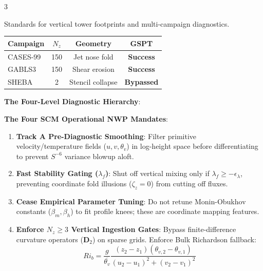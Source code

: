 \documentclass[9pt,landscape,letterpaper]{article}
\begin{document}
\begin{multicols}{3}
\begin{tcolorbox}[cheatsheetbox, title=6. Campaign Taxonomy \& NWP Mandates]
Standards for vertical tower footprints and multi-campaign diagnostics.
\begin{center}
\footnotesize
\setlength{\tabcolsep}{3pt}
\begin{tabular}{lccc}
    \toprule
    \textbf{Campaign} & $N_z$ & \textbf{Geometry} & \textbf{GSPT} \\
    \midrule
    CASES-99 & 150 & Jet nose fold & \textbf{Success} \\
    GABLS3 & 150 & Shear erosion & \textbf{Success} \\
    SHEBA & 2 & Stencil collapse & \textbf{Bypassed} \\
    \bottomrule
\end{tabular}
\end{center}
\vskip 0.5mm
\textbf{The Four-Level Diagnostic Hierarchy}:
\begin{center}
\footnotesize
{}
\end{center}
\textbf{The Four SCM Operational NWP Mandates}:
\begin{enumerate}
    \item \textbf{Track A Pre-Diagnostic Smoothing}: Filter primitive velocity/temperature fields ($u,v,\theta_v$) in log-height space before differentiating to prevent $S^{-6}$ variance blowup aloft.
    \item \textbf{Fast Stability Gating ($\lambda_f$)}: Shut off vertical mixing only if $\lambda_f \ge -\epsilon_\lambda$, preventing coordinate fold illusions ($\zeta_z = 0$) from cutting off fluxes.
    \item \textbf{Cease Empirical Parameter Tuning}: Do not retune Monin-Obukhov constants ($\beta_m, \beta_h$) to fit profile knees; these are coordinate mapping features.
    \item \textbf{Enforce $N_z \ge 3$ Vertical Ingestion Gates}: Bypass finite-difference curvature operators ($\mathbf{D}_2$) on sparse grids. Enforce Bulk Richardson fallback:
    $$Ri_b = \frac{g}{\overline{\theta_v}} \frac{(z_2 - z_1)(\theta_{v,2} - \theta_{v,1})}{(u_2 - u_1)^2 + (v_2 - v_1)^2}$$
\end{enumerate}
\end{tcolorbox}

\end{multicols}
\end{document}
